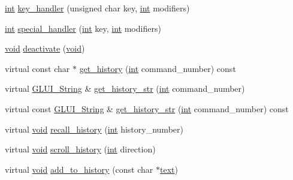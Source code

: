 \begin{DoxyCompactItemize}
\item 
\hyperlink{wglext_8h_a500a82aecba06f4550f6849b8099ca21}{int} \hyperlink{class_g_l_u_i___command_line_aac74b2f165792141d6665de1690d0aa4}{key\+\_\+handler} (unsigned char key, \hyperlink{wglext_8h_a500a82aecba06f4550f6849b8099ca21}{int} modifiers)
\item 
\hyperlink{wglext_8h_a500a82aecba06f4550f6849b8099ca21}{int} \hyperlink{class_g_l_u_i___command_line_a88dafdb294350ff13c68973b59c308d1}{special\+\_\+handler} (\hyperlink{wglext_8h_a500a82aecba06f4550f6849b8099ca21}{int} key, \hyperlink{wglext_8h_a500a82aecba06f4550f6849b8099ca21}{int} modifiers)
\item 
\hyperlink{wglext_8h_a9e6b7f1933461ef318bb000d6bd13b83}{void} \hyperlink{class_g_l_u_i___command_line_a827fe6510aa5a38b0d2c5d016a93e1ba}{deactivate} (\hyperlink{wglext_8h_a9e6b7f1933461ef318bb000d6bd13b83}{void})
\item 
virtual const char $\ast$ \hyperlink{class_g_l_u_i___command_line_a565145da6c84b9f925ca30735fc27686}{get\+\_\+history} (\hyperlink{wglext_8h_a500a82aecba06f4550f6849b8099ca21}{int} command\+\_\+number) const 
\item 
virtual \hyperlink{glui_8h_aada824856f7bcf29794719981ebd8f60}{G\+L\+U\+I\+\_\+\+String} \& \hyperlink{class_g_l_u_i___command_line_a43403d60b3ac8534b84393c5328b7a03}{get\+\_\+history\+\_\+str} (\hyperlink{wglext_8h_a500a82aecba06f4550f6849b8099ca21}{int} command\+\_\+number)
\item 
virtual const \hyperlink{glui_8h_aada824856f7bcf29794719981ebd8f60}{G\+L\+U\+I\+\_\+\+String} \& \hyperlink{class_g_l_u_i___command_line_a9365735c17057bea2039db66d8df67f3}{get\+\_\+history\+\_\+str} (\hyperlink{wglext_8h_a500a82aecba06f4550f6849b8099ca21}{int} command\+\_\+number) const 
\item 
virtual \hyperlink{wglext_8h_a9e6b7f1933461ef318bb000d6bd13b83}{void} \hyperlink{class_g_l_u_i___command_line_a6f8d01fd2db25c98723f85172c93fb01}{recall\+\_\+history} (\hyperlink{wglext_8h_a500a82aecba06f4550f6849b8099ca21}{int} history\+\_\+number)
\item 
virtual \hyperlink{wglext_8h_a9e6b7f1933461ef318bb000d6bd13b83}{void} \hyperlink{class_g_l_u_i___command_line_a82e2cd651cbc5431b6e4ad88c4c01472}{scroll\+\_\+history} (\hyperlink{wglext_8h_a500a82aecba06f4550f6849b8099ca21}{int} direction)
\item 
virtual \hyperlink{wglext_8h_a9e6b7f1933461ef318bb000d6bd13b83}{void} \hyperlink{class_g_l_u_i___command_line_a79894d2a826c7b042c93c401a915b28f}{add\+\_\+to\+\_\+history} (const char $\ast$\hyperlink{class_g_l_u_i___control_af0d60e9736f4dbc34e9a536e75876d72}{text})

\end{DoxyCompactItemize}
